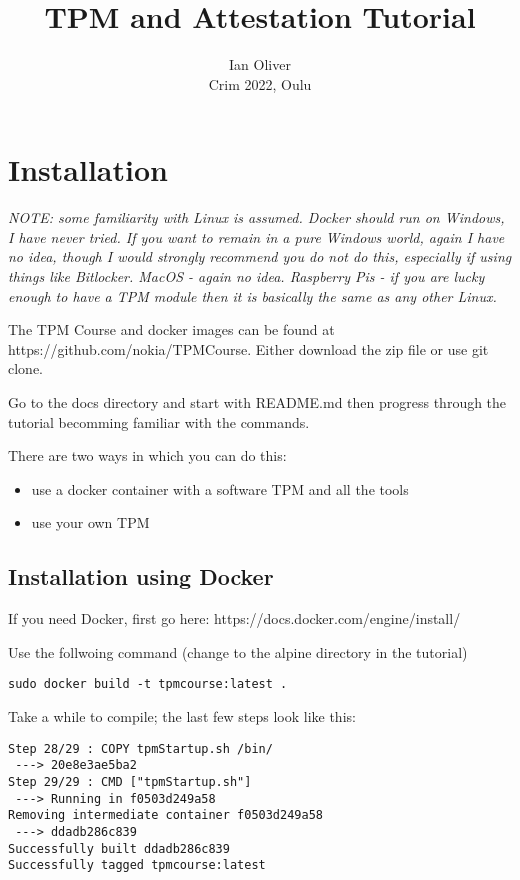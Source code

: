 \documentclass[10pt,a4paper]{article}
\begin{document}
\title{TPM and Attestation Tutorial}
\author{Ian Oliver\\Crim 2022, Oulu}
\maketitle

\tableofcontents

\section{Installation}

\textit{NOTE: some familiarity with Linux is assumed. Docker should run on Windows, I have never tried. If you want to remain in a pure Windows world, again I have no idea, though I would strongly recommend you do not do this, especially if using things like Bitlocker. MacOS - again no idea. Raspberry Pis - if you are lucky enough to have a TPM module then it is basically the same as any other Linux.}

The TPM Course and docker images can be found at https://github.com/nokia/TPMCourse. Either download the zip file or use git clone. 

Go to the docs directory and start with README.md then progress through the tutorial becomming familiar with the commands.

There are two ways in which you can do this:
\begin{itemize}
 \item use a docker container with a software TPM and all the tools 
 \item use your own TPM
\end{itemize}

\subsection{Installation using Docker}

If you need Docker, first go here: https://docs.docker.com/engine/install/

Use the follwoing command (change to the alpine directory in the tutorial)

\texttt{sudo docker build -t tpmcourse:latest .}

Take a while to compile; the last few steps look like this:

\begin{verbatim}
Step 28/29 : COPY tpmStartup.sh /bin/
 ---> 20e8e3ae5ba2
Step 29/29 : CMD ["tpmStartup.sh"]
 ---> Running in f0503d249a58
Removing intermediate container f0503d249a58
 ---> ddadb286c839
Successfully built ddadb286c839
Successfully tagged tpmcourse:latest
\end{verbatim}
\end{document}
